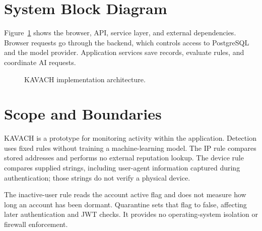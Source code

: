 \section{System Block Diagram}
Figure~\ref{fig:architecture} shows the browser, API, service layer, and external dependencies. Browser requests go through the backend, which controls access to PostgreSQL and the model provider. Application services save records, evaluate rules, and coordinate AI requests.
\begin{figure}[htbp]\centering{}\caption{KAVACH implementation architecture.}\label{fig:architecture}\end{figure}

\section{Scope and Boundaries}
KAVACH is a prototype for monitoring activity within the application. Detection uses fixed rules without training a machine-learning model. The IP rule compares stored addresses and performs no external reputation lookup. The device rule compares supplied strings, including user-agent information captured during authentication; those strings do not verify a physical device.

The inactive-user rule reads the account active flag and does not measure how long an account has been dormant. Quarantine sets that flag to false, affecting later authentication and JWT checks. It provides no operating-system isolation or firewall enforcement.

